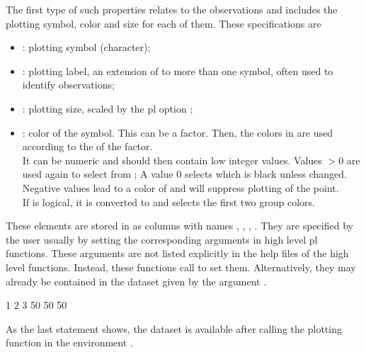 \documentclass[11pt]{article}
\begin{document}
The first type of such properties relates to the observations and includes
the plotting symbol, color and size for each of them.
These specifications are
\begin{itemize}
\item 
  : plotting symbol (character);
\item
  : plotting label, an extension of  to more than one symbol,
  often used to identify observations;
\item
  : plotting size, scaled by the pl option ;
\item
  : color of the symbol. 
  This can be a factor. Then, the colors in 
  are used according to the  of the factor.\\
  It can be numeric and should then contain low integer values.
  Values $>0$ are used again to select from ;
  A value $0$ selects  which is black unless changed.
  Negative values lead to a color of  and will suppress plotting of
  the point.\\
  If  is logical, it is converted to  and selects the
  first two group colors. 
\end{itemize}
These elements are stored in  as columns with names
, , , .
They are specified by the user usually by setting the corresponding
arguments  in high level pl functions.
These arguments are not listed explicitly in the help files of 
the high level functions. 
Instead, these functions call  to set them.
Alternatively, they may already be contained in the dataset given by the 
argument .
\begin{Schunk}
\begin{Soutput}
 1  2  3 
50 50 50 
\end{Soutput}
\end{Schunk}
As the last statement shows, the  dataset is available after
calling the plotting function in the environment .
\end{document}
